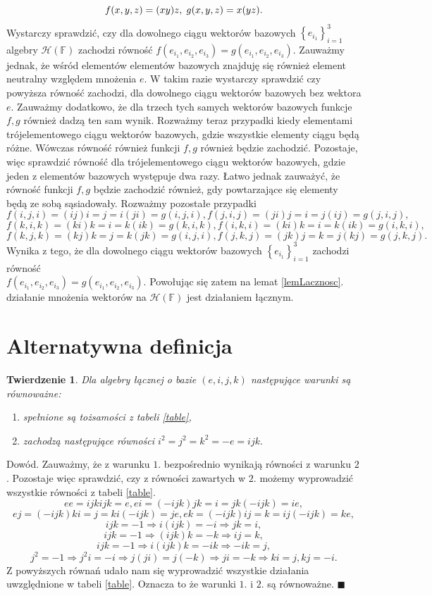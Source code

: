 \documentclass[a4paper,twoside,11pt,reqno]{mwrep}
\theoremstyle{plain} \newtheorem{twr}{Twierdzenie}
\theoremstyle{plain} \newtheorem{lem}{Lemat}
\theoremstyle{definition} \newtheorem{defi}{Definicja}
\theoremstyle{remark} \newtheorem*{wni}{Wniosek}
\theoremstyle{definition} \newtheorem{uwaga}{Uwaga}
\theoremstyle{definition}\newtheorem{prz}{Przykład}
\newenvironment{dowod}{\par\vspace{0.1cm}\par{\sc Dowód.}}{\hfill $\blacksquare$\par\vspace{0.4cm}\par}
\begin{document}
$$f(x,y,z)=(xy)z,\hspace{1mm}g(x,y,z)=x(yz).$$ 
Wystarczy sprawdzić, czy dla dowolnego ciągu wektorów bazowych  $\left\{ e_{i_1}\right\}_{i=1}^3$ algebry $\mathcal{H}(\mathbb{F})$ zachodzi równość
$f(e_{i_1},e_{i_2},e_{i_3})=g(e_{i_1},e_{i_2},e_{i_3})$. Zauważmy jednak, że wśród elementów
elementów bazowych znajduję się również element neutralny względem mnożenia $e$. W takim razie wystarczy sprawdzić czy powyższa równość zachodzi, dla dowolnego ciągu wektorów bazowych bez wektora $e$. Zauważmy dodatkowo, że dla trzech tych samych wektorów bazowych
funkcje $f,g$ również dadzą ten sam wynik. Rozważmy teraz przypadki kiedy elementami
trójelementowego ciągu wektorów bazowych, gdzie wszystkie elementy ciągu będą różne. Wówczas równość również funkcji $f,g$ również będzie zachodzić. Pozostaje, więc sprawdzić równość dla trójelementowego ciągu wektorów bazowych, 
gdzie jeden z elementów bazowych występuje dwa razy. Łatwo jednak zauważyć, że równość funkcji $f,g$ będzie zachodzić również, gdy powtarzające się elementy będą ze sobą sąsiadowały. Rozważmy pozostałe przypadki
$$f(i,j,i)=(ij)i=j=i(ji)=g(i,j,i),f(j,i,j)=(ji)j=i=j(ij)=g(j,i,j),$$
$$f(k,i,k)=(ki)k=i=k(ik)=g(k,i,k),f(i,k,i)=(ki)k=i=k(ik)=g(i,k,i),$$
$$f(k,j,k)=(kj)k=j=k(jk)=g(i,j,i),f(j,k,j)=(jk)j=k=j(kj)=g(j,k,j).$$
Wynika z tego, że dla dowolnego ciągu wektorów bazowych $\left\{ e_{i_1}\right\}_{i=1}^3$ zachodzi równość\\
$f(e_{i_1},e_{i_2},e_{i_3})=g(e_{i_1},e_{i_2},e_{i_3})$. Powołując się zatem na  lemat \ref{lemLacznosc}. działanie mnożenia wektorów na $\mathcal{H}(\mathbb{F})$ jest działaniem łącznym.
\section{Alternatywna definicja}
\begin{twr}
Dla algebry łącznej o bazie $(e,i,j,k)$ następujące warunki są równoważne:
\begin{enumerate}
\item spełnione są tożsamości z tabeli \ref{table},
\item zachodzą następujące równości $i^2=j^2=k^2=-e=ijk.$
\end{enumerate}
\end{twr}
\begin{dowod}
Zauważmy, że z warunku $\mathit{1}.$ bezpośrednio wynikają równości z warunku
$\mathit{2}$.
Pozostaje więc sprawdzić, czy z równości zawartych w $\mathit{2}$. możemy wyprowadzić wszystkie równości z tabeli \ref{table}. 
$$ee=ijkijk=e,ei=(-ijk)jk=i=jk(-ijk)=ie,$$
$$ej=(-ijk)ki=j=ki(-ijk)=je,ek=(-ijk)ij=k=ij(-ijk)=ke,$$
$$ijk=-1 \Rightarrow i(ijk) = -i\Rightarrow jk = i, $$
$$ijk=-1 \Rightarrow (ijk)k = -k\Rightarrow ij = k, $$
$$ijk=-1 \Rightarrow i(ijk)k = -ik\Rightarrow -ik = j, $$
$$j^2=-1 \Rightarrow j^2i=-i \Rightarrow j(ji) = j(-k)\Rightarrow ji=-k \Rightarrow ki=j  , kj = -i. $$
Z powyższych równań udało nam się wyprowadzić wszystkie działania uwzględnione 
w tabeli \ref{table}. Oznacza to że warunki $\mathit{1}$. i $\mathit{2}$. są równoważne.
\end{dowod}
\end{document}
